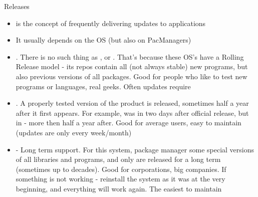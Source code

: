 \documentclass[usenames,dvipsnames,10pt,aspectratio=169]{beamer}
\begin{document}
\begin{frame}{Releases}
    \begin{itemize}
        \item {} is the concept of frequently delivering updates to applications
        \item It usually depends on the OS (but also on PacManagers)
        \item {}. There is no such thing as ,  or . That's because these OS's have a Rolling Release model - its repos contain all (not always stable) new programs, but also previous versions of all packages. Good for people who like to test new programs or languages, real geeks. Often updates require
        \item {}. A properly tested version of the product is released, sometimes half a year after it first appears. For example,  was in  two days after official release, but in  - more then half a year after. Good for average users, easy to maintain (updates are only every week/month)
        \item {} - Long term support. For this system, package manager  some special versions of all libraries and programs, and only  are released for a long term (sometimes up to decades). Good for corporations, big companies. If something is not working - reinstall the system as it was at the very beginning, and everything will work again. The easiest to maintain
    \end{itemize}
\end{frame}
\end{document}
